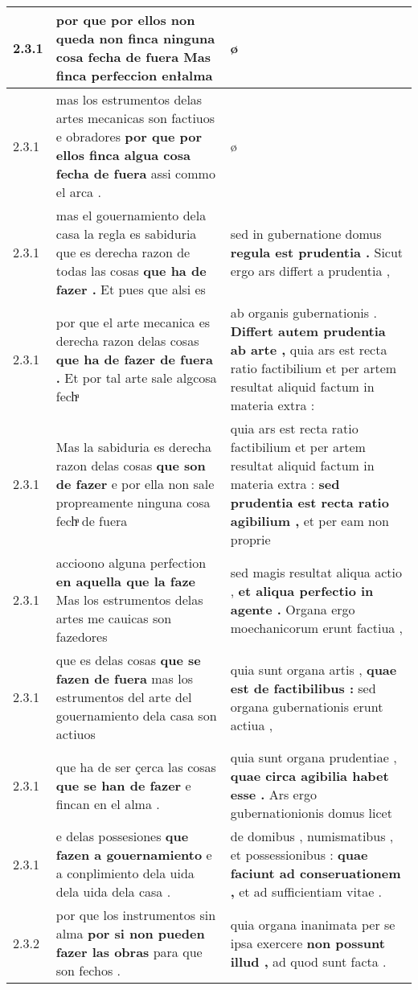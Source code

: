 \begin{tabular}{|p{1cm}|p{6.5cm}|p{6.5cm}|}
2.3.1 & por que por ellos non queda \textbf{ non finca ninguna cosa fecha de fuera } Mas finca perfeccion enłalma & ø \\\hline
2.3.1 & mas los estrumentos delas artes mecanicas son factiuos e obradores \textbf{ por que por ellos finca algua cosa fecha de fuera } assi commo el arca . & ø \\\hline
2.3.1 & mas el gouernamiento dela casa la regla es sabiduria que es derecha razon de todas las cosas \textbf{ que ha de fazer . } Et pues que alsi es & sed in gubernatione domus \textbf{ regula est prudentia . } Sicut ergo ars differt a prudentia , \\\hline
2.3.1 & por que el arte mecanica es derecha razon delas cosas \textbf{ que ha de fazer de fuera . } Et por tal arte sale algcosa fechͣ & ab organis gubernationis . \textbf{ Differt autem prudentia ab arte , } quia ars est recta ratio factibilium et per artem resultat aliquid factum in materia extra : \\\hline
2.3.1 & Mas la sabiduria es derecha razon delas cosas \textbf{ que son de fazer } e por ella non sale propreamente ninguna cosa fechͣ de fuera & quia ars est recta ratio factibilium et per artem resultat aliquid factum in materia extra : \textbf{ sed prudentia est recta ratio agibilium , } et per eam non proprie \\\hline
2.3.1 & accioono alguna perfection \textbf{ en aquella que la faze } Mas los estrumentos delas artes me cauicas son fazedores & sed magis resultat aliqua actio , \textbf{ et aliqua perfectio in agente . } Organa ergo moechanicorum erunt factiua , \\\hline
2.3.1 & que es delas cosas \textbf{ que se fazen de fuera } mas los estrumentos del arte del gouernamiento dela casa son actiuos & quia sunt organa artis , \textbf{ quae est de factibilibus : } sed organa gubernationis erunt actiua , \\\hline
2.3.1 & que ha de ser çerca las cosas \textbf{ que se han de fazer } e fincan en el alma . & quia sunt organa prudentiae , \textbf{ quae circa agibilia habet esse . } Ars ergo gubernationionis domus licet \\\hline
2.3.1 & e delas possesiones \textbf{ que fazen a gouernamiento } e a conplimiento dela uida dela uida dela casa . & de domibus , numismatibus , et possessionibus : \textbf{ quae faciunt ad conseruationem , } et ad sufficientiam vitae . \\\hline
2.3.2 & por que los instrumentos sin alma \textbf{ por si non pueden fazer las obras } para que son fechos . & quia organa inanimata per se ipsa exercere \textbf{ non possunt illud , } ad quod sunt facta . \\\hline

\end{tabular}
